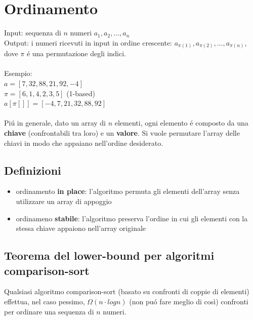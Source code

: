 \documentclass{article}
\begin{document}
\section{Ordinamento}
Input: sequenza di $n$ numeri $a_1, a_2, \dots, a_n$\\
Output: i numeri ricevuti in input in ordine crescente: $a_{\pi(1)}, a_{\pi(2)}, \dots, a_{\pi(n)}$, dove $\pi$ é una permutazione degli indici.\\\\
Esempio:\\
$a = [7, 32, 88, 21, 92, -4]$\\
$\pi = [6,1,4,2,3,5]$ (1-based)\\
$a[\pi[]] = [-4,7,21,32,88,92]$\\\\
Piú in generale, dato un array di $n$ elementi, ogni elemento é composto da una \textbf{chiave} (confrontabili tra loro) e un \textbf{valore}. Si vuole permutare l'array delle chiavi in modo che appaiano nell'ordine desiderato.

\subsection{Definizioni}
\begin{itemize}
	\item ordinamento \textbf{in place}: l'algoritmo permuta gli elementi dell'array senza utilizzare un array di appoggio
	\item ordinameno \textbf{stabile}: l'algoritmo preserva l'ordine in cui gli elementi con la stessa chiave appaiono nell'array originale
\end{itemize}

\subsection{Teorema del lower-bound per algoritmi comparison-sort}
Qualsiasi algoritmo comparison-sort (basato su confronti di coppie di elementi) effettua, nel caso pessimo, $\Omega(n \cdot logn)$ (non puó fare meglio di così) confronti per ordinare una sequenza di $n$ numeri.\\\\
\end{document}
